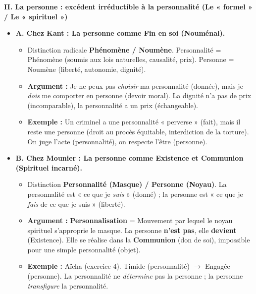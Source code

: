 \documentclass[11pt]{article}
\begin{document}
\begin{exoresolu}
\textbf{II. La personne : excédent irréductible à la personnalité (Le « formel » / Le « spirituel »)}
\begin{itemize}
    \item \textbf{A. Chez Kant : La personne comme Fin en soi (Nouménal).}
    \begin{itemize}
        \item Distinction radicale \textbf{Phénomène / Noumène}. Personnalité = Phénomène (soumis aux lois naturelles, causalité, prix). Personne = Noumène (liberté, autonomie, dignité).
        \item \textbf{Argument :} Je ne peux pas \emph{choisir} ma personnalité (donnée), mais je \emph{dois} me comporter en personne (devoir moral). La dignité n'a pas de prix (incomparable), la personnalité a un prix (échangeable).
        \item \textbf{Exemple :} Un criminel a une personnalité « perverse » (fait), mais il reste une personne (droit au procès équitable, interdiction de la torture). On juge l'acte (personnalité), on respecte l'être (personne).
    \end{itemize}
    \item \textbf{B. Chez Mounier : La personne comme Existence et Communion (Spirituel incarné).}
    \begin{itemize}
        \item Distinction \textbf{Personnalité (Masque) / Personne (Noyau)}. La personnalité est « ce que je \emph{suis} » (donné) ; la personne est « ce que je \emph{fais} de ce que je suis » (liberté).
        \item \textbf{Argument :} \textbf{Personnalisation} = Mouvement par lequel le noyau spirituel s'approprie le masque. La personne \textbf{n'est pas}, elle \textbf{devient} (Existence). Elle se réalise dans la \textbf{Communion} (don de soi), impossible pour une simple personnalité (objet).
        \item \textbf{Exemple :} Aïcha (exercice 4). Timide (personnalité) $\to$ Engagée (personne). La personnalité ne \emph{détermine} pas la personne ; la personne \emph{transfigure} la personnalité.
    \end{itemize}
\end{itemize}


\end{exoresolu}
\end{document}
